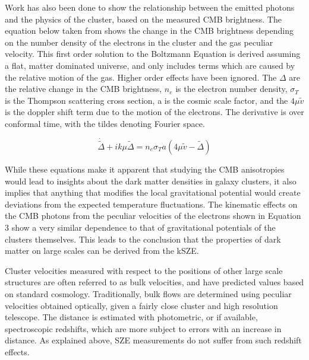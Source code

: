 \documentclass[manuscript]{aastex}
\begin{document}
Work has also been done to show the relationship between the emitted photons and the physics of the cluster, based on the measured CMB brightness. The equation below taken from \cite{Dodelson1995} shows the change in the CMB brightness depending on the number density of the electrons in the cluster and the gas peculiar velocity. This first order solution to the Boltzmann Equation is derived assuming a flat, matter dominated universe, and only includes terms which are caused by the relative motion of the gas. Higher order effects have been ignored. The $\Delta$ are the relative change in the CMB brightness, $n_{e}$ is the electron number density, $\sigma_{T}$ is the Thompson scattering cross section, a is the cosmic scale factor, and the $4 \mu \tilde v$ is the doppler shift term due to the motion of the electrons. The derivative is over conformal time, with the tildes denoting Fourier space. 

\begin{equation}
\dot{\tilde \Delta} + ik\mu \tilde\Delta = n_{e} \sigma_{T} a (4 \mu \tilde v - \tilde \Delta)
\end{equation}

While these equations make it apparent that studying the CMB anisotropies would lead to insights about the dark matter densities in galaxy clusters, it also implies that anything that modifies the local gravitational potential would create deviations from the expected temperature fluctuations. The kinematic effects on the CMB photons from the peculiar velocities of the electrons shown in Equation 3 show a very similar dependence to that of gravitational potentials of the clusters themselves. This leads to the conclusion that the properties of dark matter on large scales can be derived from the kSZE. 

Cluster velocities measured with respect to the positions of other large scale structures are often referred to as bulk velocities, and have predicted values based on standard cosmology.  Traditionally, bulk flows are determined using peculiar velocities obtained optically, given a fairly close cluster and high resolution telescope. The distance is estimated with photometric, or if available, spectroscopic redshifts, which are more subject to errors with an increase in distance. As explained above, SZE measurements do not suffer from such redshift effects.
\end{document}
